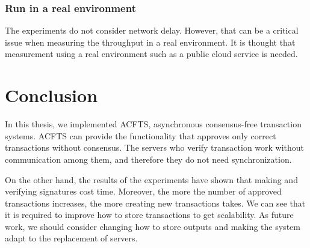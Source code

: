 \documentclass[a4paper, oneside]{discothesis}
\begin{document}
\subsection{Run in a real environment}
The experiments do not consider network delay.
However, that can be a critical issue when measuring the throughput in a real environment.
It is thought that measurement using a real environment such as a public cloud service is needed.


\chapter{Conclusion}
In this thesis, we implemented ACFTS, asynchronous consensus-free transaction systems.
ACFTS can provide the functionality that approves only correct transactions without consensus.
The servers who verify transaction work without communication among them,
and therefore they do not need synchronization.

On the other hand, the results of the experiments have shown that
making and verifying signatures cost time.
Moreover, the more the number of approved transactions increases,
the more creating new transactions takes.
We can see that it is required to improve how to store transactions to get scalability.
As future work, we should consider changing how to store outputs
and making the system adapt to the replacement of servers.




\end{document}
